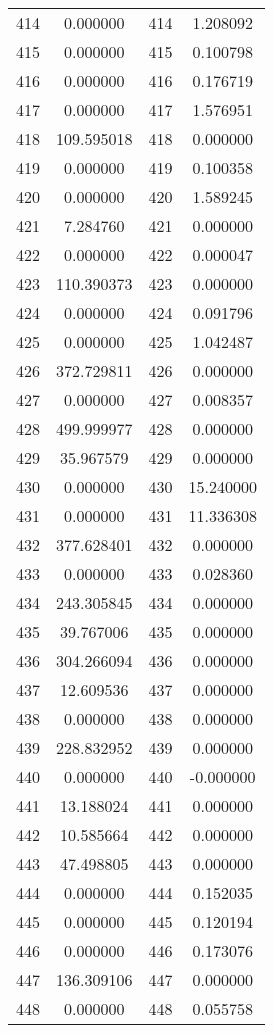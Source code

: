 \documentclass[12pt]{article}
\begin{document}
\begin{longtable}{@{}cccc@{}}
414 & 0.000000 & 414 & 1.208092 \\
415 & 0.000000 & 415 & 0.100798 \\
416 & 0.000000 & 416 & 0.176719 \\
417 & 0.000000 & 417 & 1.576951 \\
418 & 109.595018 & 418 & 0.000000 \\
419 & 0.000000 & 419 & 0.100358 \\
420 & 0.000000 & 420 & 1.589245 \\
421 & 7.284760 & 421 & 0.000000 \\
422 & 0.000000 & 422 & 0.000047 \\
423 & 110.390373 & 423 & 0.000000 \\
424 & 0.000000 & 424 & 0.091796 \\
425 & 0.000000 & 425 & 1.042487 \\
426 & 372.729811 & 426 & 0.000000 \\
427 & 0.000000 & 427 & 0.008357 \\
428 & 499.999977 & 428 & 0.000000 \\
429 & 35.967579 & 429 & 0.000000 \\
430 & 0.000000 & 430 & 15.240000 \\
431 & 0.000000 & 431 & 11.336308 \\
432 & 377.628401 & 432 & 0.000000 \\
433 & 0.000000 & 433 & 0.028360 \\
434 & 243.305845 & 434 & 0.000000 \\
435 & 39.767006 & 435 & 0.000000 \\
436 & 304.266094 & 436 & 0.000000 \\
437 & 12.609536 & 437 & 0.000000 \\
438 & 0.000000 & 438 & 0.000000 \\
439 & 228.832952 & 439 & 0.000000 \\
440 & 0.000000 & 440 & -0.000000 \\
441 & 13.188024 & 441 & 0.000000 \\
442 & 10.585664 & 442 & 0.000000 \\
443 & 47.498805 & 443 & 0.000000 \\
444 & 0.000000 & 444 & 0.152035 \\
445 & 0.000000 & 445 & 0.120194 \\
446 & 0.000000 & 446 & 0.173076 \\
447 & 136.309106 & 447 & 0.000000 \\
448 & 0.000000 & 448 & 0.055758 \\

\end{longtable}
\end{document}
